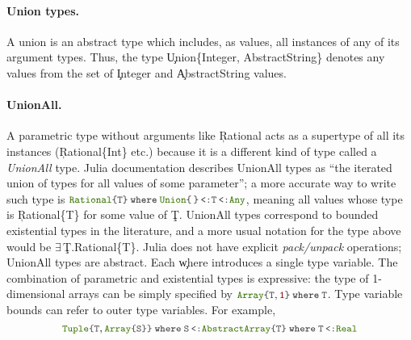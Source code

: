\paragraph{Union types.}
A union is an abstract type which includes, as values, all instances of any
of its argument types. Thus, the type \c{Union\{Integer, AbstractString\}}
denotes any values from the set of \c{Integer} and \c{AbstractString}
values.

\paragraph{UnionAll.} A parametric type without arguments like \c{Rational}
acts as a supertype of all its instances (\c{Rational\{Int\}} etc.)
because it is a different kind of type called a \emph{UnionAll} type.  Julia
documentation describes UnionAll types as ``the iterated union of types for
all values of some parameter''; a more accurate way to write such type is
\(  \texttt{\small\color{jlbuiltin} Rational}   \texttt{\small\color{jlkeyword} \{}  \texttt{\small\color{jlbase}T}  \texttt{\small\color{jlkeyword} \}\kern0pt} \:  \texttt{\small\color{jlbase}\textbf{where}\kern0pt} \:  \texttt{\small\color{jlbuiltin} Union}\! \, \texttt{\small\color{jlkeyword} \{}  \,  \texttt{\small\color{jlkeyword} \}\kern0pt} \!\! \,\,\, \texttt{\small\color{jlkeyword} <:}\,\, \!\! \texttt{\small\color{jlbase}T} \!\! \,\,\, \texttt{\small\color{jlkeyword} <:}\,\, \!\! \texttt{\small\color{jlbuiltin} Any} \), meaning all values whose type is
\c{Rational\{T\}} for some value of \c{T}.  UnionAll types correspond
to bounded existential types in the literature, and a more usual notation
for the type above would be $\exists$\,\c{T.Rational\{T\}}. Julia does not have explicit
  \emph{pack/unpack} operations; UnionAll types are  abstract.
Each \c{where} introduces a single type variable. The combination of
parametric and existential types is expressive: the type of 1-dimensional
arrays can be simply specified by
%
\(  \texttt{\small\color{jlbuiltin} Array}   \texttt{\small\color{jlkeyword} \{}  \texttt{\small\color{jlbase}T}  \ottsym{,}   \texttt{\small\color{jlstring} 1}   \texttt{\small\color{jlkeyword} \}\kern0pt} \:  \texttt{\small\color{jlbase}\textbf{where}\kern0pt} \:  \texttt{\small\color{jlbase}T} \).  
%
Type variable bounds can refer to outer type variables. For example, 
\[  \texttt{\small\color{jlbuiltin} Tuple}\! \, \texttt{\small\color{jlkeyword} \{}  \texttt{\small\color{jlbase}T}  \ottsym{,}   \texttt{\small\color{jlbuiltin} Array}   \texttt{\small\color{jlkeyword} \{}  \texttt{\small\color{jlbase}S}  \texttt{\small\color{jlkeyword} \}\kern0pt}  \texttt{\small\color{jlkeyword} \}\kern0pt} \:  \texttt{\small\color{jlbase}\textbf{where}\kern0pt} \:  \texttt{\small\color{jlbase}S} \!\! \,\,\, \texttt{\small\color{jlkeyword} <:}\,\, \!\!  \texttt{\small\color{jlbuiltin} AbstractArray}    \texttt{\small\color{jlkeyword} \{}  \texttt{\small\color{jlbase}T}  \texttt{\small\color{jlkeyword} \}\kern0pt} \:  \texttt{\small\color{jlbase}\textbf{where}\kern0pt} \:  \texttt{\small\color{jlbase}T} \!\! \,\,\, \texttt{\small\color{jlkeyword} <:}\,\, \!\!  \texttt{\small\color{jlbuiltin} Real}  \]
